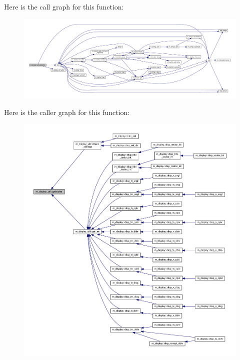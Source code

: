 Here is the call graph for this function\+:
\nopagebreak
\begin{figure}[H]
\begin{center}
\leavevmode
\includegraphics[width=350pt]{namespacem__display__util_a692b7279b1883d8139b60e480aa1e430_cgraph}
\end{center}
\end{figure}
Here is the caller graph for this function\+:
\nopagebreak
\begin{figure}[H]
\begin{center}
\leavevmode
\includegraphics[width=350pt]{namespacem__display__util_a692b7279b1883d8139b60e480aa1e430_icgraph}
\end{center}
\end{figure}
\mbox{\label{namespacem__display__util_a5c3310ac01f093fd857b2a3aa3189e02}} 
